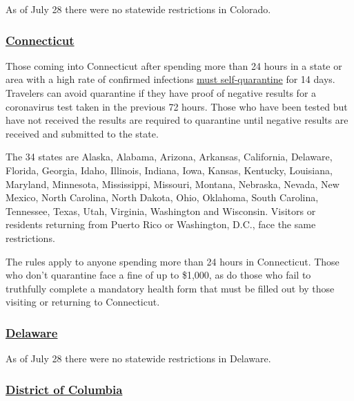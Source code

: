As of July 28 there were no statewide restrictions in Colorado.

\hypertarget{connecticut}{%
\subsubsection{\texorpdfstring{\href{https://portal.ct.gov/Coronavirus/Covid-19-Knowledge-Base/Travel-In-or-Out-of-CT}{Connecticut}}{Connecticut}}\label{connecticut}}

Those coming into Connecticut after spending more than 24 hours in a
state or area with a high rate of confirmed infections
\href{https://www.nytimes3xbfgragh.onion/2020/07/24/nyregion/coronavirus-test-results-nyc.html}{must
self-quarantine} for 14 days. Travelers can avoid quarantine if they
have proof of negative results for a coronavirus test taken in the
previous 72 hours. Those who have been tested but have not received the
results are required to quarantine until negative results are received
and submitted to the state.

The 34 states are Alaska, Alabama, Arizona, Arkansas, California,
Delaware, Florida, Georgia, Idaho, Illinois, Indiana, Iowa, Kansas,
Kentucky, Louisiana, Maryland, Minnesota, Mississippi, Missouri,
Montana, Nebraska, Nevada, New Mexico, North Carolina, North Dakota,
Ohio, Oklahoma, South Carolina, Tennessee, Texas, Utah, Virginia,
Washington and Wisconsin. Visitors or residents returning from Puerto
Rico or Washington, D.C., face the same restrictions.

The rules apply to anyone spending more than 24 hours in Connecticut.
Those who don't quarantine face a fine of up to \$1,000, as do those who
fail to truthfully complete a mandatory health form that must be filled
out by those visiting or returning to Connecticut.

\hypertarget{delaware}{%
\subsubsection{\texorpdfstring{\href{https://www.visitdelaware.com/industry/covid-19-in-delaware/}{Delaware}}{Delaware}}\label{delaware}}

As of July 28 there were no statewide restrictions in Delaware.

\hypertarget{district-of-columbia}{%
\subsubsection{\texorpdfstring{\href{https://washington.org/dc-information/coronavirus-travel-update-washington-dc}{District
of Columbia}}{District of Columbia}}\label{district-of-columbia}}

